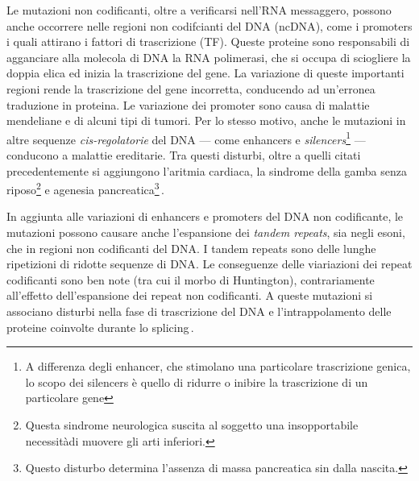 Le mutazioni non codificanti, oltre a verificarsi nell'\acs{RNA} messaggero, possono anche occorrere nelle regioni non codifcianti del \acs{DNA} (\acs{ncDNA}), come i promoters i quali attirano i fattori di trascrizione (\acs{TF}). Queste proteine sono responsabili di agganciare alla molecola di \acs{DNA} la \acs{RNA} polimerasi, che si occupa di sciogliere la doppia elica ed inizia la trascrizione del gene. La variazione di queste importanti regioni rende la trascrizione del gene incorretta, conducendo ad un'erronea traduzione in proteina. Le variazione dei promoter sono causa di malattie mendeliane e di alcuni tipi di tumori. Per lo stesso motivo, anche le mutazioni in altre sequenze \textsl{cis-regolatorie} del \acs{DNA} — come enhancers e \textit{silencers}\footnote{A differenza degli enhancer, che stimolano una particolare trascrizione genica, lo scopo dei silencers è quello di ridurre o inibire la trascrizione di un particolare gene} — conducono a malattie ereditarie. Tra questi disturbi, oltre a quelli citati precedentemente si aggiungono l'aritmia cardiaca, la sindrome della gamba senza riposo\footnote{Questa sindrome neurologica suscita al soggetto una insopportabile necessitàdi muovere gli arti inferiori.} e agenesia pancreatica\footnote{Questo disturbo determina l'assenza di massa pancreatica sin dalla nascita.}\,\cite{zhang2015non, french2020role, pagni2022non, khurana2016role}.

In aggiunta alle variazioni di enhancers e promoters del \acs{DNA} non codificante, le mutazioni possono causare anche l'espansione dei \textit{tandem repeats}, sia negli esoni, che in regioni non codificanti del \acs{DNA}. I tandem repeats sono delle lunghe ripetizioni di ridotte sequenze di \acs{DNA}. Le conseguenze delle viariazioni dei repeat codificanti sono ben note (tra cui il morbo di Huntington), contrariamente all'effetto dell'espansione dei repeat non codificanti. A queste mutazioni si associano disturbi nella fase di trascrizione del \acs{DNA} e l'intrappolamento delle proteine coinvolte durante lo splicing\,\cite{french2020role}.

